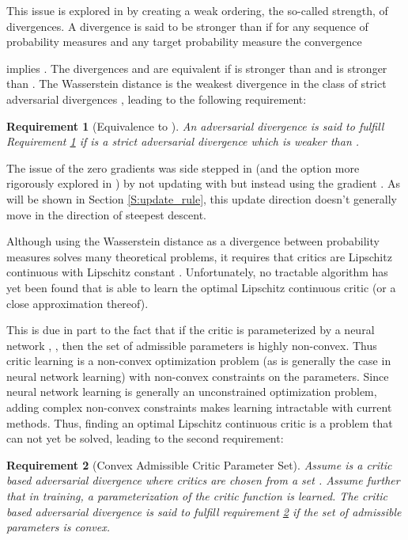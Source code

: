 \documentclass{article}
\newtheorem{requirement}{Requirement}
\begin{document}
 This issue is explored in \cite{liu2017approximation} by creating a weak ordering, the so-called strength, of divergences.
 A divergence  is said to be stronger than  if for any sequence of probability measures  and
 any target probability measure  the convergence
 
 implies .
 The divergences  and  are equivalent if  is stronger than  and  is stronger than .
 The Wasserstein distance  is the weakest divergence in the class of strict adversarial divergences \cite{liu2017approximation},
 leading to the following requirement:

 \begin{requirement}[Equivalence to ]\label{R:nonzero}
 An adversarial divergence  is said to fulfill Requirement \ref{R:nonzero} if  is a strict adversarial divergence
 which is weaker than .
 \end{requirement}

 The issue of the zero gradients was side stepped in \cite{goodfellow2014generative}
 (and the option more rigorously explored in \cite{fedus2017many})
 by not updating with  but instead using the gradient
 .
 As will be shown in Section \ref{S:update_rule}, this update direction doesn't generally move  in the direction of steepest descent.

 Although using the Wasserstein distance as a divergence between probability measures solves many theoretical problems,
 it requires that critics are Lipschitz continuous with Lipschitz constant .
 Unfortunately, no tractable algorithm has yet been found that is able to learn the optimal Lipschitz continuous critic
 (or a close approximation thereof).

 This is due in part to the fact that if the critic is
 parameterized by a neural network , , then the set of admissible parameters
  is highly non-convex.
 Thus critic learning is a non-convex optimization problem (as is generally the case in neural network learning)
 with non-convex constraints on the parameters.
 Since neural network learning is generally an unconstrained optimization problem, adding complex non-convex constraints makes learning intractable with current methods.
 Thus, finding an optimal Lipschitz continuous critic is a problem that can not yet be solved,
 leading to the second requirement:

 \begin{requirement}[Convex Admissible Critic Parameter Set]\label{R:convex_admissible}
 Assume  is a critic based adversarial divergence where critics are chosen from a set .
 Assume further that in training, a parameterization
  of the critic function  is learned.
 The critic based adversarial divergence  is said to fulfill requirement \ref{R:convex_admissible} if
 the set of admissible parameters  is convex.
 \end{requirement}
\end{document}
